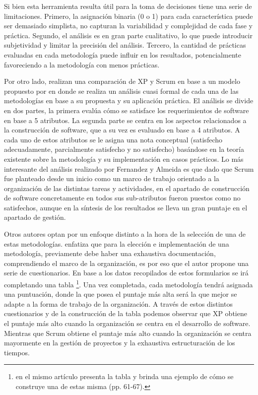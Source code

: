 \documentclass[a4paper,10pt]{article}
\begin{document}
	Si bien esta herramienta resulta útil para la toma de decisiones tiene una serie de limitaciones. Primero, la asignación binaria (0 o 1) para cada característica puede ser demasiado simplista, no capturan la variabilidad y complejidad de cada fase y práctica. Segundo, el análisis es en gran parte cualitativo, lo que puede introducir subjetividad y limitar la precisión del análisis. Tercero, la cantidad de prácticas evaluadas en cada metodología puede influir en los resultados, potencialmente favoreciendo a la metodología con menos prácticas.
	
	Por otro lado, \textcite{fernandes2010classification} realizan una comparación de XP y Scrum en base a un modelo propuesto por \textcite{sol1983feature} en donde se realiza un análisis cuasi formal de cada una de las metodologías en base a su propuesta y su aplicación práctica. El análisis se divide en dos partes, la primera evalúa cómo se satisface los requerimientos de software en base a 5 atributos. La segunda parte se centra en los aspectos relacionados a la construcción de software, que a su vez es evaluado en base a 4 atributos. A cada uno de estos atributos se le asigna una nota conceptual (satisfecho adecuadamente, parcialmente satisfecho y no satisfecho) basándose en la teoría existente sobre la metodología y su implementación en casos prácticos. Lo más interesante del análisis realizado por Fernandez y Almeida es que dado que Scrum fue planteado desde un inicio como un marco de trabajo orientado a la organización de las distintas tareas y actividades, en el apartado de construcción de software concretamente en todos sus sub-atributos fueron puestos como no satisfechos, aunque en la síntesis de los resultados se lleva un gran puntaje en el apartado de gestión.
	
	Otros autores optan por un enfoque distinto a la hora de la selección de una de estas metodologías. \textcite{perez2012guia} enfatiza que para la elección e implementación de una metodología, previamente debe haber una exhaustiva documentación, comprendiendo el marco de la organización, es por eso que el autor propone una serie de cuestionarios. En base a los datos recopilados de estos formularios se irá completando una tabla \footnote{\textcite{perez2012guia} en el mismo artículo presenta la tabla y brinda una ejemplo de cómo se construye una de estas misma (pp. 61-67).}. Una vez completada, cada metodología tendrá asignada una puntuación, donde la que posea el puntaje más alta será la que mejor se adapte a la forma de trabajo de la organización. A través de estos distintos cuestionarios y de la construcción de la tabla podemos observar que XP obtiene el puntaje más alto cuando la organización se centra en el desarrollo de software. Mientras que Scrum obtiene el puntaje más alto cuando la organización se centra mayormente en la gestión de proyectos y la exhaustiva estructuración de los tiempos.
	
\end{document}
